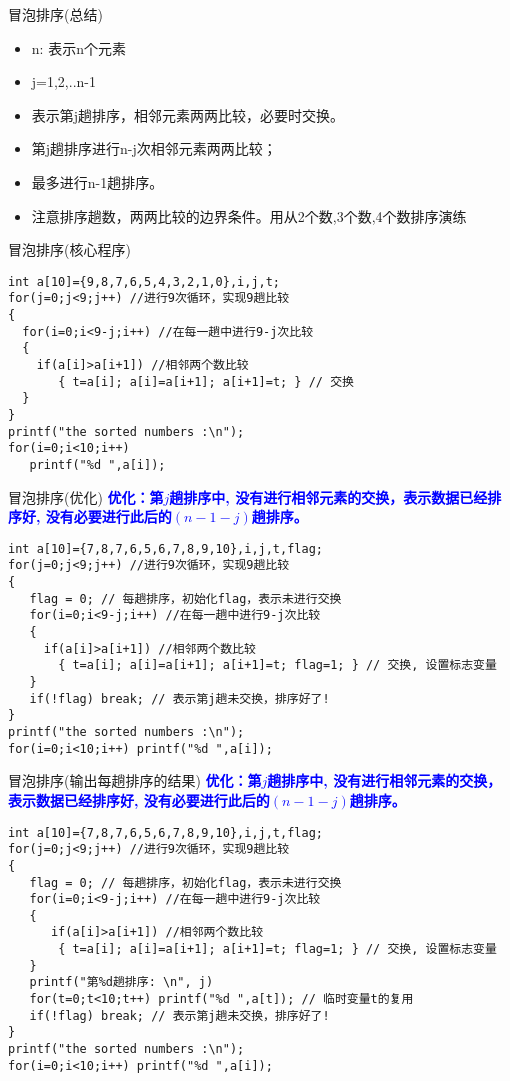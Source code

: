\begin{frame}{冒泡排序(总结)}
\begin{itemize}
	\setlength{\itemsep}{.5cm}
	\item n: 表示n个元素
	\item j=1,2,..n-1
	\item 表示第j趟排序，相邻元素两两比较，必要时交换。
	\item 第j趟排序进行n-j次相邻元素两两比较；
	\item 最多进行n-1趟排序。
	\item 注意排序趟数，两两比较的边界条件。用从2个数,3个数,4个数排序演练
\end{itemize}
\end{frame}

\begin{frame}{冒泡排序(核心程序)}
\begin{lstlisting}
int a[10]={9,8,7,6,5,4,3,2,1,0},i,j,t;
for(j=0;j<9;j++) //进行9次循环，实现9趟比较
{
  for(i=0;i<9-j;i++) //在每一趟中进行9-j次比较
  {
    if(a[i]>a[i+1]) //相邻两个数比较 
       { t=a[i]; a[i]=a[i+1]; a[i+1]=t; } // 交换
  }
}
printf("the sorted numbers :\n");
for(i=0;i<10;i++)
   printf("%d ",a[i]);
\end{lstlisting}
\end{frame}

\begin{frame}{冒泡排序(优化)}
\textbf{\textcolor{blue}{优化：第$j$趟排序中, 没有进行相邻元素的交换，表示数据已经排序好, 没有必要进行此后的$(n-1-j)$趟排序。}}
\begin{lstlisting}
int a[10]={7,8,7,6,5,6,7,8,9,10},i,j,t,flag;
for(j=0;j<9;j++) //进行9次循环，实现9趟比较
{
   flag = 0; // 每趟排序，初始化flag，表示未进行交换
   for(i=0;i<9-j;i++) //在每一趟中进行9-j次比较
   {
     if(a[i]>a[i+1]) //相邻两个数比较 
       { t=a[i]; a[i]=a[i+1]; a[i+1]=t; flag=1; } // 交换, 设置标志变量
   }
   if(!flag) break; // 表示第j趟未交换，排序好了!
}
printf("the sorted numbers :\n");
for(i=0;i<10;i++) printf("%d ",a[i]);
\end{lstlisting}
\end{frame}

\begin{frame}{冒泡排序(输出每趟排序的结果)}
\textbf{\textcolor{blue}{优化：第$j$趟排序中, 没有进行相邻元素的交换，表示数据已经排序好, 没有必要进行此后的$(n-1-j)$趟排序。}}
\begin{lstlisting}
int a[10]={7,8,7,6,5,6,7,8,9,10},i,j,t,flag;
for(j=0;j<9;j++) //进行9次循环，实现9趟比较
{
   flag = 0; // 每趟排序，初始化flag，表示未进行交换
   for(i=0;i<9-j;i++) //在每一趟中进行9-j次比较
   {
      if(a[i]>a[i+1]) //相邻两个数比较 
       { t=a[i]; a[i]=a[i+1]; a[i+1]=t; flag=1; } // 交换, 设置标志变量
   }
   printf("第%d趟排序: \n", j)
   for(t=0;t<10;t++) printf("%d ",a[t]); // 临时变量t的复用
   if(!flag) break; // 表示第j趟未交换，排序好了!
}
printf("the sorted numbers :\n");
for(i=0;i<10;i++) printf("%d ",a[i]);
\end{lstlisting}
\end{frame}